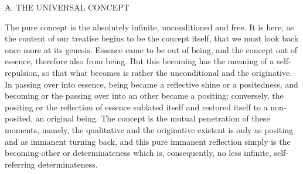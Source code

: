 
A. THE UNIVERSAL CONCEPT

The pure concept is the absolutely infinite, unconditioned and free.
It is here, as the content of our treatise begins to be the concept itself,
that we must look back once more at its genesis.
Essence came to be out of being,
and the concept out of essence,
therefore also from being.
But this becoming has the meaning of a self-repulsion,
so that what becomes is rather the unconditional and the originative.
In passing over into essence, being became a reflective shine or a positedness,
and becoming or the passing over into an other became a positing;
conversely, the positing or the reflection of essence
sublated itself and restored itself to a non-posited, an original being.
The concept is the mutual penetration of these moments,
namely, the qualitative and the originative existent is
only as positing and as immanent turning back,
and this pure immanent reflection simply is
the becoming-other or determinateness
which is, consequently, no less infinite,
self-referring determinateness.

